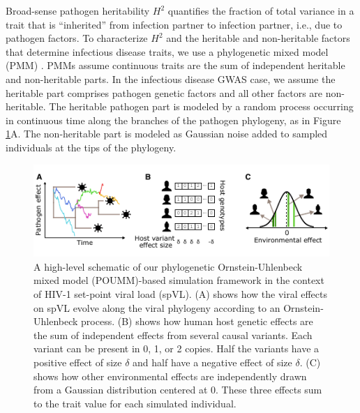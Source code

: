 \documentclass[11pt]{article}
\begin{document}
\begin{linenumbers}
Broad-sense pathogen heritability $H^2$ quantifies the fraction of total variance in a trait that is ``inherited'' from infection partner to infection partner, i.e., due to pathogen factors. To characterize $H^2$ and the heritable and non-heritable factors that determine infectious disease traits, we use a phylogenetic mixed model (PMM) \citep{Housworth2004}. PMMs assume continuous traits are the sum of independent heritable and non-heritable parts. In the infectious disease GWAS case, we assume the heritable part comprises pathogen genetic factors and all other factors are non-heritable. The heritable pathogen part is modeled by a random process occurring in continuous time along the branches of the pathogen phylogeny, as in Figure \ref{fig:spVLModel}A. The non-heritable part is modeled as Gaussian noise added to sampled individuals at the tips of the phylogeny.

\begin{figure}[H]
	\begin{center}
	\includegraphics[width = \linewidth]{fig1_Stadler_MBE-21-1179.pdf}
	\caption{A high-level schematic of our phylogenetic Ornstein-Uhlenbeck mixed model (POUMM)-based simulation framework in the context of HIV-1 set-point viral load (spVL). (A) shows how the viral effects on spVL evolve along the viral phylogeny according to an Ornstein-Uhlenbeck process. (B) shows how human host genetic effects are the sum of independent effects from several causal variants. Each variant can be present in 0, 1, or 2 copies. Half the variants have a positive effect of size $\delta$ and half have a negative effect of size $\delta$. (C) shows how other environmental effects are independently drawn from a Gaussian distribution centered at 0. These three effects sum to the trait value for each simulated individual.}
		\label{fig:spVLModel}
	\end{center}
\end{figure}


\end{linenumbers}
\end{document}
